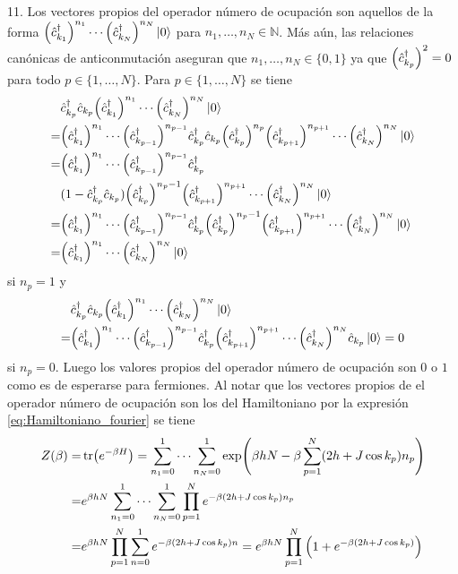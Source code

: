 \documentclass{article}
\begin{document}
11. Los vectores propios del operador número de ocupación son aquellos de la forma $\qty(\hat{c}_{k_1}^\dagger)^{n_1}\cdots\qty(\hat{c}_{k_N}^\dagger)^{n_N}\ket{0}$ para $n_1,\dots,n_N\in\mathbb{N}$. Más aún, las relaciones canónicas de anticonmutación aseguran que $n_1,\dots,n_N\in\{0,1\}$ ya que $\qty(\hat{c}_{k_p}^\dagger)^2=0$ para todo $p\in\{1,\dots,N\}$. Para $p\in\{1,\dots,N\}$ se tiene
\begin{align}
\begin{split}
&\hat{c}_{k_p}^\dagger \hat{c}_{k_p}\qty(\hat{c}_{k_1}^\dagger)^{n_1}\cdots\qty(\hat{c}_{k_N}^\dagger)^{n_N}\ket{0}\\
=&\qty(\hat{c}_{k_1}^\dagger)^{n_1}\cdots\qty(\hat{c}_{k_{p-1}}^\dagger)^{n_{p-1}}\hat{c}_{k_p}^\dagger \hat{c}_{k_p}\qty(\hat{c}_{k_p}^\dagger)^{n_p}\qty(\hat{c}_{k_{p+1}}^\dagger)^{n_{p+1}}\cdots\qty(\hat{c}_{k_N}^\dagger)^{n_N}\ket{0}\\
=&\qty(\hat{c}_{k_1}^\dagger)^{n_1}\cdots\qty(\hat{c}_{k_{p-1}}^\dagger)^{n_{p-1}}\hat{c}_{k_p}^\dagger\\
&(1-\hat{c}_{k_p}^\dagger\hat{c}_{k_p})\qty(\hat{c}_{k_p}^\dagger)^{n_p-1}\qty(\hat{c}_{k_{p+1}}^\dagger)^{n_{p+1}}\cdots\qty(\hat{c}_{k_N}^\dagger)^{n_N}\ket{0}\\
=&\qty(\hat{c}_{k_1}^\dagger)^{n_1}\cdots\qty(\hat{c}_{k_{p-1}}^\dagger)^{n_{p-1}}\hat{c}_{k_p}^\dagger\qty(\hat{c}_{k_p}^\dagger)^{n_p-1}\qty(\hat{c}_{k_{p+1}}^\dagger)^{n_{p+1}}\cdots\qty(\hat{c}_{k_N}^\dagger)^{n_N}\ket{0}\\
=&\qty(\hat{c}_{k_1}^\dagger)^{n_1}\cdots\qty(\hat{c}_{k_N}^\dagger)^{n_N}\ket{0}
\end{split}
\end{align}
si $n_p=1$ y 
\begin{align}
\begin{split}
&\hat{c}_{k_p}^\dagger \hat{c}_{k_p}\qty(\hat{c}_{k_1}^\dagger)^{n_1}\cdots\qty(\hat{c}_{k_N}^\dagger)^{n_N}\ket{0}\\
=&\qty(\hat{c}_{k_1}^\dagger)^{n_1}\cdots\qty(\hat{c}_{k_{p-1}}^\dagger)^{n_{p-1}}\hat{c}_{k_p}^\dagger\qty(\hat{c}_{k_{p+1}}^\dagger)^{n_{p+1}}\cdots\qty(\hat{c}_{k_N}^\dagger)^{n_N}\hat{c}_{k_p}\ket{0}=0\\
\end{split}
\end{align}
si $n_p=0$. Luego los valores propios del operador número de ocupación son $0$ o $1$ como es de esperarse para fermiones. Al notar que los vectores propios de el operador número de ocupación son los del Hamiltoniano por la expresión \eqref{eq:Hamiltoniano_fourier} se tiene
\begin{align}
\begin{split}
Z(\beta)=&\tr(e^{-\beta H})=\sum_{n_1=0}^1\cdots\sum_{n_N=0}^1\exp(\beta hN-\beta\sum_{p=1}^N(2h+J\cos{k_p})n_p)\\
=&e^{\beta hN}\sum_{n_1=0}^1\cdots\sum_{n_N=0}^1\prod_{p=1}^Ne^{-\beta(2h+J\cos{k_p})n_p}\\
=&e^{\beta hN}\prod_{p=1}^N\sum_{n=0}^1e^{-\beta(2h+J\cos{k_p})n}=e^{\beta hN}\prod_{p=1}^N\qty(1+e^{-\beta(2h+J\cos{k_p})})
\end{split}
\end{align}
\end{document}
